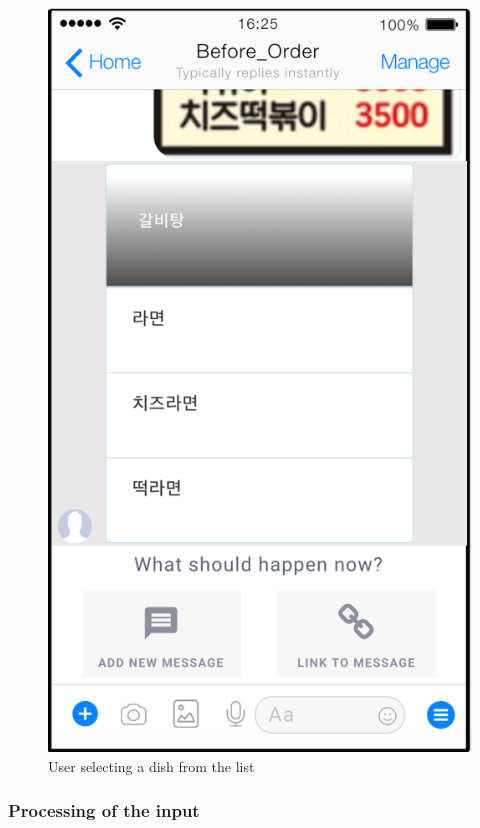 \begin{figure}[htbp]
\centerline{\includegraphics[width=\linewidth]{./pictures/facebook_response_selection}}
\caption{User selecting a dish from the list}
\label{fig:facebook_response_selection}
\end{figure}
\FloatBarrier

\subsubsection{Processing of the input}

